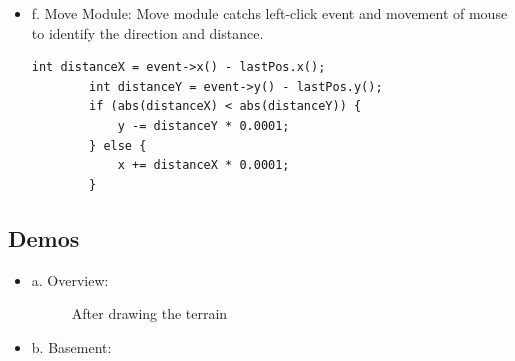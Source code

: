 \documentclass[11pt]{article}
\begin{document}
\begin{itemize}
\item f. Move Module:
Move module catchs left-click event and movement of mouse to identify the direction and distance.
\begin{lstlisting}
int distanceX = event->x() - lastPos.x();
        int distanceY = event->y() - lastPos.y();
        if (abs(distanceX) < abs(distanceY)) {
            y -= distanceY * 0.0001;
        } else {
            x += distanceX * 0.0001;
        }
\end{lstlisting}
\end{itemize}
\subsection{Demos} 
\begin{itemize}
\item a. Overview:
\begin{figure}[H] 
  \caption{After drawing the terrain}
\end{figure}
\item b. Basement:
\begin{figure}[H] 

\end{figure}
\end{itemize}
\end{document}
